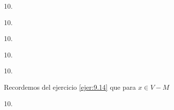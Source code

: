 \documentclass[twoside]{article}
\begin{document}
\newpage

\begin{ejercicio}{10.}

\end{ejercicio}
\begin{solucion}

\end{solucion}
\newpage

\begin{ejercicio}{10.}

\end{ejercicio}
\begin{solucion}

\end{solucion}
\newpage

\begin{ejercicio}{10.}

\end{ejercicio}
\begin{solucion}


\end{solucion}
\newpage

\begin{ejercicio}{10.}

\end{ejercicio}
\begin{solucion}

 
\end{solucion}
\newpage

\begin{ejercicio}{10.}

\end{ejercicio}
\begin{solucion}
Recordemos del ejercicio \ref{ejer:9.14} que para $x\in V-M$

\end{solucion}
\newpage

\begin{ejercicio}{10.}

\end{ejercicio}
\begin{solucion}

\end{solucion}
\end{document}
